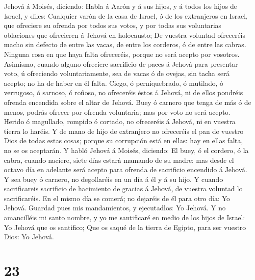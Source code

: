 Jehová á Moisés, diciendo:  Habla á Aarón y á sus hijos, y
á todos los hijos de Israel, y diles: Cualquier varón de la casa de
Israel, ó de los extranjeros en Israel, que ofreciere su ofrenda por
todos sus votos, y por todas sus voluntarias oblaciones que ofrecieren á
Jehová en holocausto;  De vuestra voluntad ofreceréis macho
sin defecto de entre las vacas, de entre los corderos, ó de entre las
cabras.  Ninguna cosa en que haya falta ofreceréis, porque
no será acepto por vosotros.  Asimismo, cuando alguno
ofreciere sacrificio de paces á Jehová para presentar voto, ú ofreciendo
voluntariamente, sea de vacas ó de ovejas, sin tacha será acepto; no ha
de haber en él falta.  Ciego, ó perniquebrado, ó mutilado,
ó verrugoso, ó sarnoso, ó roñoso, no ofreceréis éstos á Jehová, ni de
ellos pondréis ofrenda encendida sobre el altar de Jehová. 
Buey ó carnero que tenga de más ó de menos, podrás ofrecer por ofrenda
voluntaria; mas por voto no será acepto.  Herido ó
magullado, rompido ó cortado, no ofreceréis á Jehová, ni en vuestra
tierra lo haréis.  Y de mano de hijo de extranjero no
ofreceréis el pan de vuestro Dios de todas estas cosas; porque su
corrupción está en ellas: hay en ellas falta, no se os aceptarán.
 Y habló Jehová á Moisés, diciendo:  El buey,
ó el cordero, ó la cabra, cuando naciere, siete días estará mamando de
su madre: mas desde el octavo día en adelante será acepto para ofrenda
de sacrificio encendido á Jehová.  Y sea buey ó carnero, no
degollaréis en un día á él y á su hijo.  Y cuando
sacrificareis sacrificio de hacimiento de gracias á Jehová, de vuestra
voluntad lo sacrificaréis.  En el mismo día se comerá; no
dejaréis de él para otro día: Yo Jehová.  Guardad pues mis
mandamientos, y ejecutadlos: Yo Jehová.  Y no amancilléis
mi santo nombre, y yo me santificaré en medio de los hijos de Israel: Yo
Jehová que os santifico;  Que os saqué de la tierra de
Egipto, para ser vuestro Dios: Yo Jehová.

\hypertarget{section-22}{%
\section{23}\label{section-22}}

